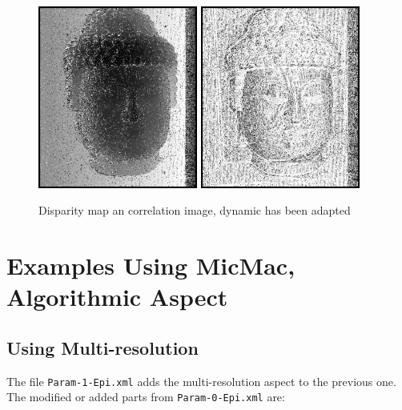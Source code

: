 \begin{figure}
\hspace{10 mm}
\includegraphics[height=60mm]{FIGS/Boudhas/Px1-Param0.jpg}
\hspace{10 mm}
\includegraphics[height=60mm]{FIGS/Boudhas/CorrelParam0.jpg}
\caption{Disparity map an correlation image, dynamic has been adapted}
\label{FIG:DISP:COR:BASIC}
\end{figure}


\section{Examples Using MicMac, Algorithmic Aspect}


\subsection{Using Multi-resolution}

\label{BASIC:MULRES}

The file {\tt Param-1-Epi.xml} adds the multi-resolution aspect
to the previous one. The modified or added parts from
{\tt Param-0-Epi.xml} are:



